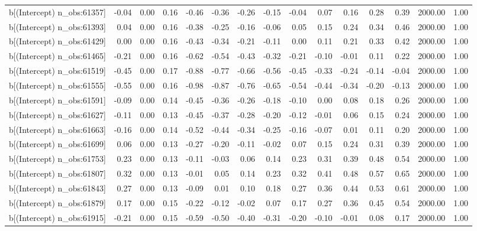 \begin{table}[ht]
\begin{tabular}{rrrrrrrrrrrrrrr}
  b[(Intercept) n\_obs:61357] & -0.04 & 0.00 & 0.16 & -0.46 & -0.36 & -0.26 & -0.15 & -0.04 & 0.07 & 0.16 & 0.28 & 0.39 & 2000.00 & 1.00 \\ 
  b[(Intercept) n\_obs:61393] & 0.04 & 0.00 & 0.16 & -0.38 & -0.25 & -0.16 & -0.06 & 0.05 & 0.15 & 0.24 & 0.34 & 0.46 & 2000.00 & 1.00 \\ 
  b[(Intercept) n\_obs:61429] & 0.00 & 0.00 & 0.16 & -0.43 & -0.34 & -0.21 & -0.11 & 0.00 & 0.11 & 0.21 & 0.33 & 0.42 & 2000.00 & 1.00 \\ 
  b[(Intercept) n\_obs:61465] & -0.21 & 0.00 & 0.16 & -0.62 & -0.54 & -0.43 & -0.32 & -0.21 & -0.10 & -0.01 & 0.11 & 0.22 & 2000.00 & 1.00 \\ 
  b[(Intercept) n\_obs:61519] & -0.45 & 0.00 & 0.17 & -0.88 & -0.77 & -0.66 & -0.56 & -0.45 & -0.33 & -0.24 & -0.14 & -0.04 & 2000.00 & 1.00 \\ 
  b[(Intercept) n\_obs:61555] & -0.55 & 0.00 & 0.16 & -0.98 & -0.87 & -0.76 & -0.65 & -0.54 & -0.44 & -0.34 & -0.20 & -0.13 & 2000.00 & 1.00 \\ 
  b[(Intercept) n\_obs:61591] & -0.09 & 0.00 & 0.14 & -0.45 & -0.36 & -0.26 & -0.18 & -0.10 & 0.00 & 0.08 & 0.18 & 0.26 & 2000.00 & 1.00 \\ 
  b[(Intercept) n\_obs:61627] & -0.11 & 0.00 & 0.13 & -0.45 & -0.37 & -0.28 & -0.20 & -0.12 & -0.01 & 0.06 & 0.15 & 0.24 & 2000.00 & 1.00 \\ 
  b[(Intercept) n\_obs:61663] & -0.16 & 0.00 & 0.14 & -0.52 & -0.44 & -0.34 & -0.25 & -0.16 & -0.07 & 0.01 & 0.11 & 0.20 & 2000.00 & 1.00 \\ 
  b[(Intercept) n\_obs:61699] & 0.06 & 0.00 & 0.13 & -0.27 & -0.20 & -0.11 & -0.02 & 0.07 & 0.15 & 0.24 & 0.31 & 0.39 & 2000.00 & 1.00 \\ 
  b[(Intercept) n\_obs:61753] & 0.23 & 0.00 & 0.13 & -0.11 & -0.03 & 0.06 & 0.14 & 0.23 & 0.31 & 0.39 & 0.48 & 0.54 & 2000.00 & 1.00 \\ 
  b[(Intercept) n\_obs:61807] & 0.32 & 0.00 & 0.13 & -0.01 & 0.05 & 0.14 & 0.23 & 0.32 & 0.41 & 0.48 & 0.57 & 0.65 & 2000.00 & 1.00 \\ 
  b[(Intercept) n\_obs:61843] & 0.27 & 0.00 & 0.13 & -0.09 & 0.01 & 0.10 & 0.18 & 0.27 & 0.36 & 0.44 & 0.53 & 0.61 & 2000.00 & 1.00 \\ 
  b[(Intercept) n\_obs:61879] & 0.17 & 0.00 & 0.15 & -0.22 & -0.12 & -0.02 & 0.07 & 0.17 & 0.27 & 0.36 & 0.45 & 0.54 & 2000.00 & 1.00 \\ 
  b[(Intercept) n\_obs:61915] & -0.21 & 0.00 & 0.15 & -0.59 & -0.50 & -0.40 & -0.31 & -0.20 & -0.10 & -0.01 & 0.08 & 0.17 & 2000.00 & 1.00 \\ 

\end{tabular}
\end{table}
